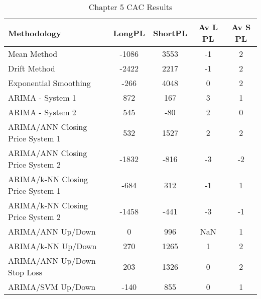 \begin{table}[ht]
\centering
\caption[Chapter 5 CAC Results]{Chapter 5 CAC Results} 
\label{tab:chp6:cac2_summary}
\begin{tabular}{lcccc}
  \toprule Methodology & LongPL & ShortPL & Av L PL & Av S PL \\ 
  \midrule Mean Method & -1086 & 3553 & -1 & 2 \\ 
  Drift Method & -2422 & 2217 & -1 & 2 \\ 
  Exponential Smoothing & -266 & 4048 & 0 & 2 \\ 
  ARIMA - System 1 & 872 & 167 & 3 & 1 \\ 
  ARIMA - System 2 & 545 & -80 & 2 & 0 \\ 
  ARIMA/ANN Closing Price System 1 & 532 & 1527 & 2 & 2 \\ 
  ARIMA/ANN Closing Price System 2 & -1832 & -816 & -3 & -2 \\ 
  ARIMA/k-NN Closing Price System 1 & -684 & 312 & -1 & 1 \\ 
  ARIMA/k-NN Closing Price System 2 & -1458 & -441 & -3 & -1 \\ 
  ARIMA/ANN Up/Down & 0 & 996 & NaN & 1 \\ 
  ARIMA/k-NN Up/Down & 270 & 1265 & 1 & 2 \\ 
  ARIMA/ANN Up/Down Stop Loss & 203 & 1326 & 0 & 2 \\ 
  ARIMA/SVM Up/Down & -140 & 855 & 0 & 1 \\ 
   \bottomrule \end{tabular}
\end{table}
